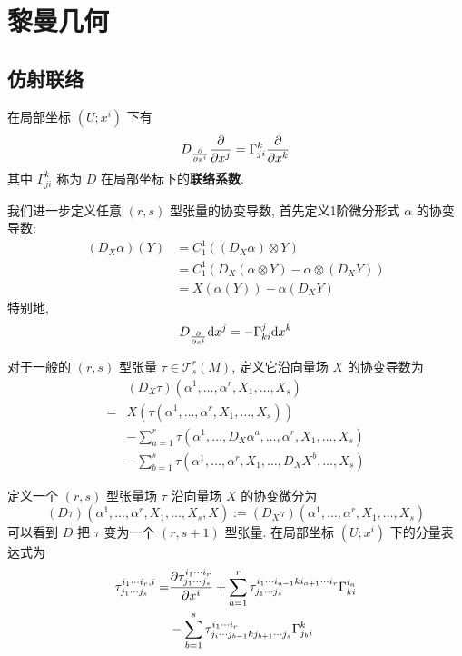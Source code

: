 \chapter{黎曼几何}
\section{仿射联络}
    在局部坐标 $\left(U;x^i\right)$ 下有
    \begin{equation*}
        D_{\frac{\partial }{\partial x^i}}\frac{\partial }{\partial x^j}=\Gamma^{k}_{ji}\frac{\partial }{\partial x^k}
    \end{equation*}
    其中 $\Gamma^{k}_{ji}$ 称为 $D$ 在局部坐标下的\textbf{联络系数}.

    我们进一步定义任意 $(r,s)$ 型张量的协变导数, 首先定义1阶微分形式 $\alpha$ 的协变导数:
    \begin{align*}
        \left(D_{X}\alpha\right)(Y) &= C^1_1\left((D_X\alpha)\otimes Y\right) \\
        &= C^1_1\left(D_X(\alpha\otimes Y)-\alpha\otimes(D_XY)\right) \\
        &= X(\alpha(Y))-\alpha(D_XY)
    \end{align*}
    特别地,
    \begin{equation*}
        D_{\frac{\partial }{\partial x^i}}{{\rm d} x^j} = -\Gamma_{ki}^j{{\rm d} x^k}
    \end{equation*}

    对于一般的 $(r,s)$ 型张量 $\tau\in\mathcal{T}^r_s(M)$, 定义它沿向量场 $X$ 的协变导数为
    \begin{align*}
        &(D_X\tau)(\alpha^1,\dots,\alpha^r,X_1,\dots,X_s) \\
        =& X\left(\tau(\alpha^1,\dots,\alpha^r,X_1,\dots,X_s)\right) \\
        &-\sum_{a=1}^{r}\tau\left(\alpha^1,\dots,D_X\alpha^a,\dots,\alpha^r,X_1,\dots,X_s\right) \\
        &-\sum_{b=1}^{s}\tau\left(\alpha^1,\dots,\alpha^r,X_1,\dots,D_X{X^b},\dots,X_s\right)
    \end{align*}

    定义一个 $(r,s)$ 型张量场 $\tau$ 沿向量场 $X$ 的协变微分为
    \begin{equation*}
        (D\tau)(\alpha^1,\dots,\alpha^r,X_1,\dots,X_s,X):=(D_X\tau)(\alpha^1,\dots,\alpha^r,X_1,\dots,X_s)
    \end{equation*}
    可以看到 $D$ 把 $\tau$ 变为一个 $(r,s+1)$ 型张量. 在局部坐标 $\left(U;x^i\right)$ 下的分量表达式为
    \begin{align*}
        \tau^{i_1\cdots i_r,i}_{j_1\cdots j_s} =& \frac{\partial \tau^{i_1\cdots i_r}_{j_1\cdots j_s}}{\partial x^i} + \sum_{a=1}^{r}\tau^{i_1\cdots i_{a-1}k i_{a+1}\cdots i_r}_{j_1\cdots j_s}\Gamma^{i_a}_{ki} \\
        & -\sum_{b=1}^{s}\tau^{i_1\cdots i_r}_{j_i\cdots j_{b-1}k j_{b+1}\cdots j_s}\Gamma^{k}_{j_b i}
    \end{align*}
